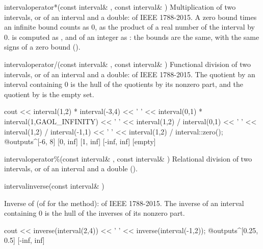 \begin{deffun}{interval}{operator*}{(const interval\& , const interval\& )}
  Multiplication of two intervals, or of an interval and a double: 
  of IEEE 1788-2015. A zero bound times an infinite bound counts as $0$, as
  the product of a real number of the interval by 0.\newinvfive{} 
  is computed as , and  of an integer  as
  : the bounds are the same, with the same signs of a zero bound
  ().\newinvfive
\end{deffun}

\begin{deffun}{interval}{operator/}{(const interval\& , const interval\& )}
  Functional division of two intervals, or of an interval and a double:
   of IEEE 1788-2015. The quotient by an interval containing 0 is
  the hull of the quotients by its nonzero part, and the quotient by
   is the empty set.
\begin{example}
cout << interval(1,2) * interval(-3,4) << ' '
     << interval(0,1) * interval(1,GAOL_INFINITY) << ' '
     << interval(1,2) / interval(0,1) << ' '
     << interval(1,2) / interval(-1,1) << ' '
     << interval(1,2) / interval::zero();
@outputs^[-6, 8] [0, inf] [1, inf] [-inf, inf] [empty]~
\end{example}
\end{deffun}

\begin{deffun}{interval}{operator\%}{(const interval\& , const interval\& )}
  Relational division of two intervals, or of an interval and a double
  ().
\end{deffun}

\begin{deffun}{interval}{inverse}{(const interval\& )}
  \begin{operation}
  \end{operation}
  Inverse of  (of  for the method):  of
  IEEE 1788-2015. The inverse of an interval containing 0 is the hull of the
  inverses of its nonzero part.
\begin{example}
cout << inverse(interval(2,4)) << ' ' << inverse(interval(-1,2));
@outputs^[0.25, 0.5] [-inf, inf]~
\end{example}
\end{deffun}


